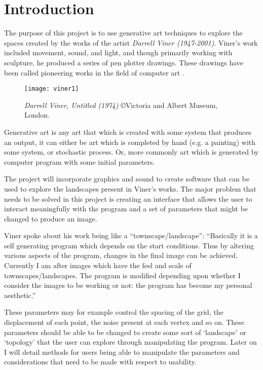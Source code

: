 \chapter{Introduction}
The purpose of this project is to use generative art techniques to explore the
spaces created by the works of the artist \emph{Darrell Viner (1947-2001)}. Viner's work
included movement, sound, and light, and though primarily working with
sculpture, he produced a series of pen plotter drawings. These drawings have
been called pioneering works in the field of computer art \citep{viner_bio}.

\begin{figure}[H]
    \texttt{[image: viner1]}
    \centering
    \caption{\emph{Darrell Viner, Untitled (1974)} \copyright Victoria and Albert Museum, London.}
\end{figure}

Generative art is any art that which is created with some system that produces
an output, it can either be art which is completed by hand (e.g. a painting)
with some system, or stochastic process. Or, more commonly art which is
generated by computer program with some initial parameters.

The project will incorporate graphics and sound to create software that can be
used to explore the landscapes present in Viner's works. The major problem that
needs to be solved in this project is creating an interface that allows the user
to interact meaningfully with the program and a set of parameters that might be
changed to produce an image.

Viner spoke about his work being like a ``townscape/landscape'': 
``Basically it is a self generating program which depends on the start
conditions. Thus by altering various aspects of the program, changes in the
final image can be achieved. Currently I am after images which have the feel and
scale of townscapes/landscapes. The program is modified depending upon whether I
consider the images to be working or not: the program has become my personal
aesthetic.'' \cite{viner_artiststatement}

These parameters may for example control the spacing of the grid, the
displacement of each point, the noise present at each vertex and so on. These
parameters should be able to be changed to create some sort of `landscape' or
`topology' that the user can explore through manipulating the program. Later on
I will detail methods for users being able to manipulate the parameters and
considerations that need to be made with respect to usability.

